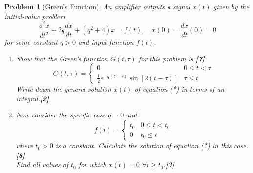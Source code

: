 \documentclass[a4paper]{article}
\theoremstyle{new}
\newtheorem{qns}{Problem}[section]
\begin{document}
\newpage
\begin{qns}[Green's Function]
An amplifier outputs a signal $x(t)$ given by the initial-value problem
\begin{equation}
    \frac{d^2x}{dt^2}+2q\frac{dx}{dt}+(q^2+4)x=f(t),\quad x(0)=\frac{dx}{dt}(0)=0\tag{*}
\end{equation}
for some constant $q>0$ and input function $f(t)$.
\begin{enumerate}[label=(\alph*)]
\item Show that the Green’s function $G(t,\tau)$ for this problem is \hfill\textbf{[7]}
$$G(t,\tau)=
\left\{
        \begin{array}{ll}
      0 & 0\leq t<\tau \\
      \frac{1}{2}e^{-q(t-\tau)}\sin[2(t-\tau)] & \tau\leq t
        \end{array}
    \right.$$
Write down the general solution $x(t)$ of equation (*) in terms of an integral.\hfill\textbf{[2]}
\item Now consider the specific case $q = 0$ and
$$f(t)=
\left\{
        \begin{array}{ll}
      t_0 & 0\leq t<t_0 \\
      0 & t_0\leq t
        \end{array}
    \right.$$
    where $t_0>0$ is a constant. Calculate the solution of equation (*) in this case.\hfill\textbf{[8]}\\[5pt]
    Find all values of $t_0$ for which $x(t)=0$ $\forall t\geq t_0$.\hfill\textbf{[3]}
    \end{enumerate}
\end{qns}
\end{document}
